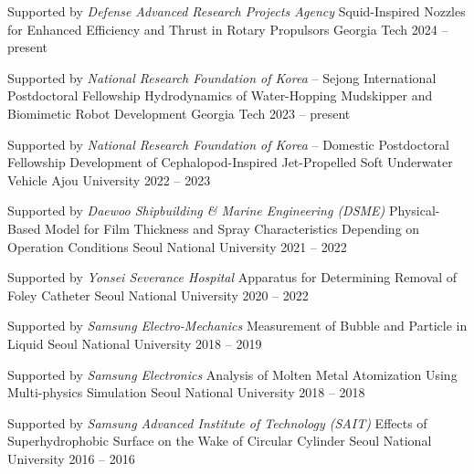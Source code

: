 
\begin{cventries}

  \cventry
    {Supported by \textit{Defense Advanced Research Projects Agency}}
    {Squid-Inspired Nozzles for Enhanced Efficiency and Thrust in Rotary Propulsors}
    {Georgia Tech}
    {2024 -- present}
    {}

  \cventry
    {Supported by \textit{National Research Foundation of Korea} -- Sejong International Postdoctoral Fellowship}
    {Hydrodynamics of Water-Hopping Mudskipper and Biomimetic Robot Development}
    {Georgia Tech}
    {2023 -- present}
    {}

  \cventry
    {Supported by \textit{National Research Foundation of Korea} -- Domestic Postdoctoral Fellowship}
    {Development of Cephalopod-Inspired Jet-Propelled Soft Underwater Vehicle}
    {Ajou University}
    {2022 -- 2023}
    {}

  \cventry
    {Supported by \textit{Daewoo Shipbuilding \& Marine Engineering (DSME)}}
    {Physical-Based Model for Film Thickness and Spray Characteristics
     Depending on Operation Conditions}
    {Seoul National University}
    {2021 -- 2022}
    {}

  \cventry
    {Supported by \textit{Yonsei Severance Hospital}}
    {Apparatus for Determining Removal of Foley Catheter}
    {Seoul National University}
    {2020 -- 2022}
    {}

  \cventry
    {Supported by \textit{Samsung Electro-Mechanics}}
    {Measurement of Bubble and Particle in Liquid}
    {Seoul National University}
    {2018 -- 2019}
    {}

  \cventry
    {Supported by \textit{Samsung Electronics}}
    {Analysis of Molten Metal Atomization Using Multi-physics Simulation}
    {Seoul National University}
    {2018 -- 2018}
    {}

  \cventry
    {Supported by \textit{Samsung Advanced Institute of Technology (SAIT)}}
    {Effects of Superhydrophobic Surface on the Wake of Circular Cylinder}
    {Seoul National University}
    {2016 -- 2016}
    {}

\end{cventries}
